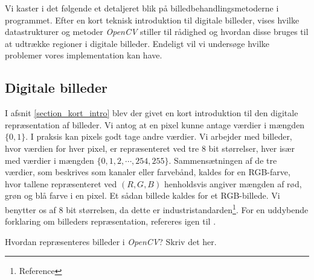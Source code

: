 {
{\sffamily Vi kaster i det følgende et detaljeret blik på
billedbehandlingsmetoderne i programmet. Efter en kort teknisk
introduktion til digitale billeder, vises hvilke datastrukturer og
metoder \emph{OpenCV} stiller til rådighed og hvordan disse bruges til
at udtrække regioner i digitale billeder. Endeligt vil vi undersøge
hvilke problemer vores implementation kan have.
}

\subsection{Digitale billeder}
I afsnit \ref{section_kort_intro} blev der givet en kort introduktion
til den digitale repræsentation af billeder. Vi antog at en pixel kunne
antage værdier i mængden $\{0, 1\}$. I praksis kan pixels godt tage
andre værdier. Vi arbejder med billeder, hvor værdien for hver pixel, er
repræsenteret ved tre 8 bit størrelser, hver især med værdier i mængden
$\{0, 1, 2, \cdots, 254, 255\}$. Sammensætningen af de tre værdier, som
beskrives som kanaler eller farvebånd, kaldes for en RGB-farve, hvor
tallene repræsenteret ved $(R,G,B)$ henholdsvis angiver mængden af rød,
grøn og blå farve i en pixel. Et sådan billede kaldes for et
RGB-billede.  Vi benytter os af 8 bit størrelsen, da dette er
industristandarden\footnote{Reference}. For en uddybende forklaring om
billeders repræsentation, refereres igen til \cite{SIOlsen}.

Hvordan repræsenteres billeder i \emph{OpenCV}? Skriv det her.

}

